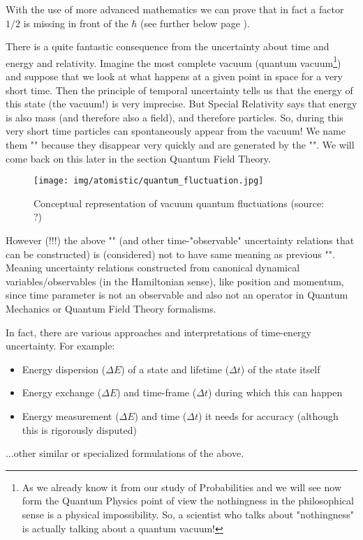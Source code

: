 \begin{enumerate}
		\begin{tcolorbox}[title=Remark,colframe=black,arc=10pt]
		With the use of more advanced mathematics we can prove that in fact a factor $1/2$ is missing in front of the $\hbar$ (see further below page \pageref{Robertson uncertainty relations}).
		\end{tcolorbox}
		There is a quite fantastic consequence from the uncertainty about time and energy and relativity. Imagine the most complete vacuum (quantum vacuum\footnote{As we already know it from our study of Probabilities and we will see now form the Quantum Physics point of view the nothingness in the philosophical sense is a physical impossibility. So, a scientist who talks about "nothingness" is actually talking about a quantum vacuum!}) and suppose that we look at what happens at a given point in space for a very short time. Then the principle of temporal uncertainty tells us that the energy of this state (the vacuum!) is very imprecise. But Special Relativity says that energy is also mass (and therefore also a field), and therefore particles. So, during this very short time particles can spontaneously appear from the vacuum! We name them "" because they disappear very quickly and are generated by the "". We will come back on this later in the section Quantum Field Theory.
		\begin{figure}[H]
			\centering
			\texttt{[image: img/atomistic/quantum\_fluctuation.jpg]}
			\caption[Conceptual representation of vacuum quantum fluctuations]{Conceptual representation of vacuum quantum fluctuations (source: ?)}
		\end{figure}
		However (!!!) the above "" (and other time-"observable" uncertainty relations that can be constructed) is (considered) not to have same meaning as previous "". Meaning uncertainty relations constructed from canonical dynamical variables/observables (in the Hamiltonian sense), like position and momentum, since time parameter is not an observable and also not an operator in Quantum Mechanics or Quantum Field Theory formalisms.
	
		In fact, there are various approaches and interpretations of time-energy uncertainty. For example:
		\begin{itemize}
			\item Energy dispersion ($\Delta E$) of a state and lifetime ($\Delta t$) of the state itself
			\item Energy exchange ($\Delta E$) and time-frame ($\Delta t$) during which this can happen
			\item Energy measurement ($\Delta E$) and time ($\Delta t$) it needs for accuracy (although this is rigorously disputed)
		\end{itemize}
		...other similar or specialized formulations of the above.
		

\end{enumerate}
